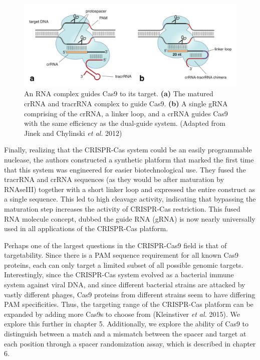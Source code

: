 \documentclass{Dissertate}
\begin{document}
\begin{figure}[!h]
	\begin{center}
	\centerline{
	\includegraphics[width=1.15\textwidth]{figures/grna.png}
	}
	\caption{An RNA complex guides Cas9 to its target. \textbf{(a)} The matured crRNA and tracrRNA complex to guide Cas9. \textbf{(b)} A single gRNA comprising of the crRNA, a linker loop, and a crRNA guides Cas9 with the same efficiency as the dual-guide system. (Adapted from Jinek and Chylinski \textit{et al.} 2012)}
	\label{fig:grna}
	\end{center}
\end{figure}

Finally, realizing that the CRISPR-Cas system could be an easily programmable nuclease, the authors constructed a synthetic platform that marked the first time that this system was engineered for easier biotechnological use. They fused the tracrRNA and crRNA sequences (as they would be after maturation by RNAseIII) together with a short linker loop and expressed the entire construct as a single sequence. This led to high cleavage activity, indicating that bypassing the maturation step increases the activity of CRISPR-Cas restriction. This fused RNA molecule concept, dubbed the guide RNA (gRNA) is now nearly universally used in all applications of the CRISPR-Cas platform.

Perhaps one of the largest questions in the CRISPR-Cas9 field is that of targetability. Since there is a PAM sequence requirement for all known Cas9 proteins, each can only target a limited subset of all possible genomic targets. Interestingly, since the CRISPR-Cas system evolved as a bacterial immune system against viral DNA, and since different bacterial strains are attacked by vastly different phages, Cas9 proteins from different strains seem to have differing PAM specificities. Thus, the targeting range of the CRISPR-Cas platform can be expanded by adding more Cas9s to choose from (Kleinstiver \textit{et al.} 2015). We explore this further in chapter 5. Additionally, we explore the ability of Cas9 to distinguish between a match and a mismatch between the spacer and target at each position through a spacer randomization assay, which is described in chapter 6.
\end{document}

